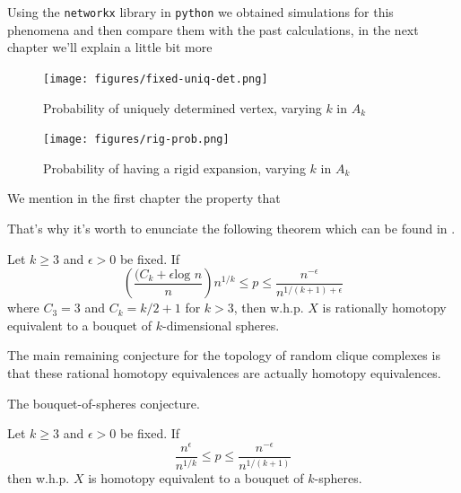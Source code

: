 Using the \texttt{networkx} library in \texttt{python} we obtained simulations for this phenomena and then compare them with the past calculations, in the next chapter we'll explain a little bit more

\begin{figure}[h!]
	\centering
	\texttt{[image: figures/fixed-uniq-det.png]}
	\caption{Probability of uniquely determined vertex, varying $k$ in $A_k$}
\end{figure}

\begin{figure}[h!]
	\centering
	\texttt{[image: figures/rig-prob.png]}
	\caption{Probability of having a rigid expansion,  varying $k$ in $A_k$}
\end{figure}

We mention in the first chapter the property that 


That's why it's worth to enunciate the following theorem which can be found in \cite[Khale, 16]{Khale}.
\begin{theorem}
Let $k \geq 3$ and $\epsilon > 0$ be fixed. If
$$\left(\frac{(C_{k} + \epsilon \text{log } n} {n} \right) n^{1/k} \leq p \leq \frac{n^{-\epsilon}}{n^{1/(k+1)+\epsilon}}$$
where $C_{3} = 3$ and $C_{k} = k/2 + 1$ for $k > 3$, then w.h.p. $X$ is rationally homotopy
equivalent to a bouquet of $k$-dimensional spheres.
\end{theorem}

The main remaining conjecture for the topology of random clique complexes is that these rational homotopy equivalences are actually homotopy equivalences.

\begin{conje}
The bouquet-of-spheres conjecture.

Let $k \geq 3$ and $\epsilon > 0$ be fixed. If
$$\frac{n^{\epsilon}}{n^{1/k}} \leq p \leq \frac{n^{-\epsilon}}{n^{1/(k+1)}}$$
then w.h.p. $X$ is homotopy equivalent to a bouquet of $k$-spheres.
\end{conje}